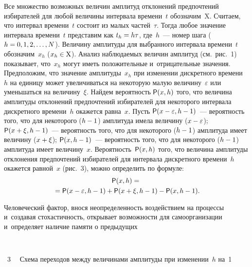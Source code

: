 \begin{multicols}{2}
    Все множество возможных величин амплитуд отклонений предпочтений 
избирателей для любой величины интервала времени~$t$ 
обозначим~$\mathrm{X}$. Считаем, что интервал времени~$t$ состоит из 
малых частей~$\tau$. Тогда любое значение интервала времени~$t$ 
представим как $t_h\hm=h\tau$, где~$h$~--- номер шага ($h\hm=0, 1, 2,\ldots 
, N$). Величину амплитуды для выбранного интервала времени~$t$ 
обозначим~$x_h$ ($x_h\hm\in \mathrm{X}$). Анализ наблюдаемых величин 
амплитуд (см.\ рис.~1) показывает, что~$x_h$ могут иметь положительные 
и~отрицательные значения. Предположим, что значение амплитуды~$x_h$ при 
изменении дискретного времени~$h$ на единицу может увеличиваться на 
некоторую малую величину~$\varepsilon$ или уменьшаться на 
величину~$\xi$. Найдем вероятность ${\sf P}(x,h)$ того, что величина амплитуды 
отклонений предпочтений избирателей для некоторого интервала дискретного 
времени~$h$ окажется равна~$x$. Пусть ${\sf P}(x-\varepsilon,h-1)$~--- вероятность 
того, что для некоторого ($h\hm-1$) амплитуда имела величину ($x \hm -
\varepsilon$); ${\sf P}(x+\xi,h-1)$~--- вероятность того, что для некоторого ($h\hm-1$) 
амплитуда имеет величину ($x\hm+\xi$); ${\sf P}(x,h-1)$~--- вероятность того, что 
для некоторого ($h\hm-1$) амплитуда имеет величину~$x$. 
Вероятность~${\sf P}(x,h)$ того, что величина амплитуды отклонения предпочтений 
избирателей для интервала дискретного времени~$h$ окажется равной~$x$ 
(рис.~3), можно определить по формуле:
    \begin{multline*}
    {\sf P}(x, h)={}\\
  {}={\sf P}(x-\varepsilon, h-1)+{\sf P}(x+\xi, h-1)-{\sf P}(x, h-1).
    \end{multline*}



    Человеческий фактор, внося неопределенность воздействием на процессы и~создавая стохастичность, открывает возможности для самоорганизации 
и~определяет наличие памяти о предыдущих\linebreak\vspace*{-12pt}

{ \begin{center}  %
 \vspace*{-2pt}
   \mbox{%
 \epsfxsize=79mm 
 }

\end{center}

\noindent
{{\figurename~3}\ \ \small{
Схема переходов между величинами амплитуды при изменении~$h$ на~1
}}}


\end{multicols}
